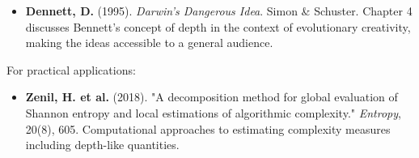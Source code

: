 \begin{itemize}
\item \textbf{Dennett, D.} (1995). \textit{Darwin's Dangerous Idea}. Simon \& Schuster. Chapter 4 discusses Bennett's concept of depth in the context of evolutionary creativity, making the ideas accessible to a general audience.
\end{itemize}

For practical applications:

\begin{itemize}
\item \textbf{Zenil, H. et al.} (2018). "A decomposition method for global evaluation of Shannon entropy and local estimations of algorithmic complexity." \textit{Entropy}, 20(8), 605. Computational approaches to estimating complexity measures including depth-like quantities.
\end{itemize}
